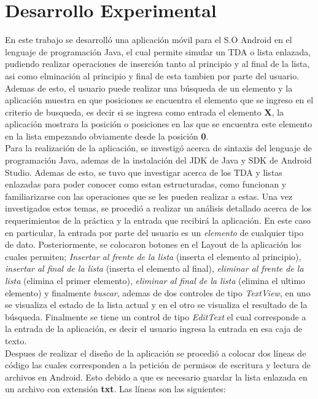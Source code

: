 \documentclass[conference]{IEEEtran}
\begin{document}
\section{Desarrollo Experimental}
En este trabajo se desarrolló una aplicación móvil para el S.O Android en el lenguaje de programación Java, el cual permite simular un TDA o lista enlazada, pudiendo realizar operaciones de inserción tanto al principio y al final de la lista, asi como elminación al principio y final de esta tambien por parte del usuario. Ademas de esto, el usuario puede realizar una búsqueda de un elemento y la aplicación muestra en que posiciones se encuentra el elemento que se ingreso en el criterio de busqueda, es decir si se ingresa como entrada el elemento \textbf{X}, la aplicación mostrara la posición o posiciones en las que se encuentra este elemento en la lista empezando obviamente desde la posición \textbf{0}. \\
Para la realización de la aplicación, se investigó acerca de sintaxis del lenguaje de programación Java, ademas de la instalación del JDK de Java y SDK de Android Studio. Ademas de esto, se tuvo que investigar acerca de los TDA y listas enlazadas para poder conocer como estan estructuradas, como funcionan y familiarizarse con las operaciones que se les pueden realizar a estas. Una vez investigados estos temas, se procedió a realizar un análisis detallado acerca de los requerimientos de la práctica y la entrada que recibirá la aplicación. En este caso en particular, la entrada por parte del usuario es un \textit{elemento} de cualquier tipo de dato. Posteriormente, se colocaron botones en el Layout de la aplicación los cuales permiten; \textit{Insertar al frente de la lista} (inserta el elemento al principio), \textit{insertar al final de la lista} (inserta el elemento al final), \textit{eliminar al frente de la lista} (elimina el primer elemento), \textit{eliminar al final de la lista} (elimina el ultimo elemento) y finalmente \textit{buscar}, ademas de dos controles de tipo \textit{TextView}, en uno se visualiza el estado de la lista actual y en el otro se visualiza el resultado de la búsqueda. Finalmente se tiene un control de tipo \textit{EditText} el cual corresponde a la entrada de la aplicación, es decir el usuario ingresa la entrada en esa caja de texto.\\
Despues de realizar el diseño de la aplicación se procedió a colocar dos líneas de código las cuales corresponden a la petición de permisos de escritura y lectura de archivos en Android. Esto debido a que es necesario guardar la lista enlazada en un archivo con extensión \textbf{txt}. Las líneas son las siguientes:\\
\end{document}
